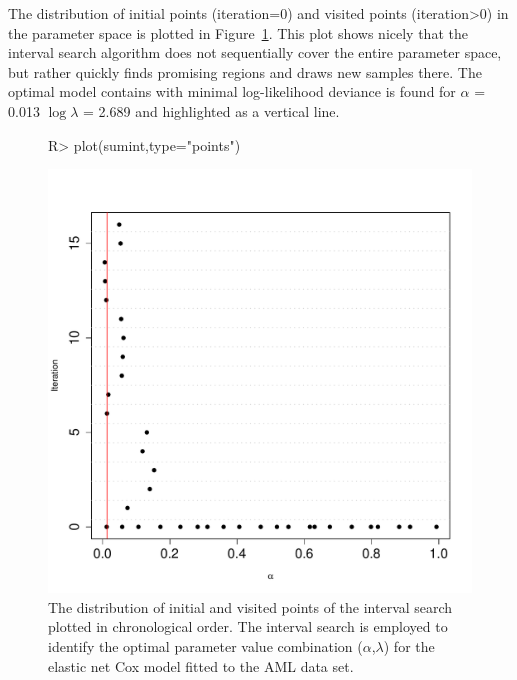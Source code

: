 \documentclass[nojss]{jss}
\begin{document}
The distribution of initial points (iteration=0) and visited points (iteration>0) in the parameter space is plotted in Figure~\ref{fig:interval_search2}.
This plot shows nicely that the interval search algorithm does not sequentially cover the entire parameter space, but rather quickly finds promising regions and draws new samples there. The optimal model contains with minimal log-likelihood deviance is found for $\alpha$ = 0.013 $\log\lambda$ = 2.689 and highlighted as a vertical line.

\begin{figure}[t!]
\begin{center}
\begin{Schunk}
\begin{Sinput}
R> plot(sumint,type="points") 
\end{Sinput}
\end{Schunk}
\includegraphics{c060_vignette-interval_search_cox_out_plot2}
\end{center}
\caption{The distribution of initial and visited points of the interval search plotted in chronological order. The interval search is employed to identify the optimal parameter value combination ($\alpha$,$\lambda$) for the elastic net Cox model fitted to the AML data set.}
\label{fig:interval_search2}
\end{figure}
\end{document}
